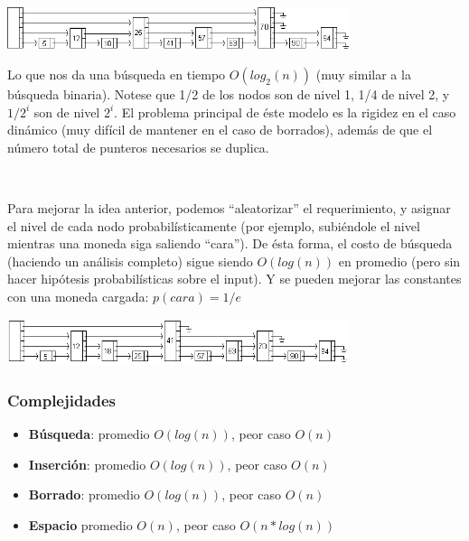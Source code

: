 \begin{center}
 \includegraphics[width=0.75\textwidth, height=0.09\textwidth]{./graficos/skip-list-fixed.png}
\end{center}

Lo que nos da una b\'usqueda en tiempo $O(log_2(n))$ (muy similar a la b\'usqueda binaria). Notese que 1/2 de los nodos son de nivel 1, 1/4 de nivel 2, y $1/2^i$ son de nivel $2^i$.
El problema principal de \'este modelo es la rigidez en el caso din\'amico (muy dif\'icil de mantener en el caso de borrados), adem\'as de que el n\'umero total de punteros necesarios se duplica.

~

Para mejorar la idea anterior, podemos ``aleatorizar'' el requerimiento, y asignar el nivel de cada nodo probabil\'isticamente (por ejemplo, subi\'endole el nivel mientras una moneda siga saliendo ``cara'').
De \'esta forma, el costo de b\'usqueda (haciendo un an\'alisis completo) sigue siendo $O(log(n))$ en promedio (pero sin hacer hip\'otesis probabil\'isticas sobre el input). Y se pueden mejorar las constantes con una moneda cargada: $p(cara)= 1/e$

\begin{center}
 \includegraphics[width=0.75\textwidth, height=0.09\textwidth]{./graficos/skip-list-relaxed.png}
\end{center}

\subsubsection{Complejidades}

\begin{itemize}
 \item \textbf{B\'usqueda}: promedio $O(log(n))$, peor caso $O(n)$
 \item \textbf{Inserci\'on}: promedio $O(log(n))$, peor caso $O(n)$
 \item \textbf{Borrado}: promedio $O(log(n))$, peor caso $O(n)$
 \item \textbf{Espacio} promedio $O(n)$, peor caso $O(n*log(n))$
\end{itemize}

